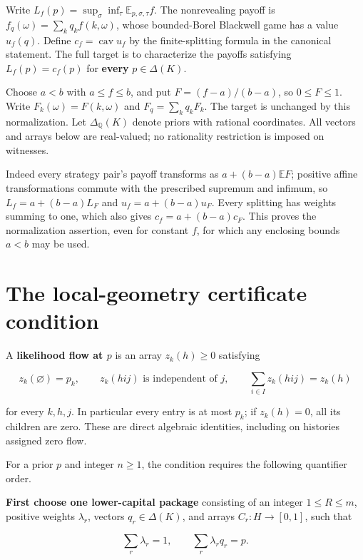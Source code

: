 \documentclass[11pt,a4paper]{article}
\begin{document}
Write \(L_f(p)=\sup_\sigma\inf_\tau\mathbb E_{p,\sigma,\tau} f\). The nonrevealing payoff is \(f_q(\omega)=\sum_kq_k f(k,\omega)\), whose bounded-Borel Blackwell game has a value \(u_f(q)\). Define \(c_f=\operatorname{cav}u_f\) by the finite-splitting formula in the canonical statement. The full target is to characterize the payoffs satisfying \(L_f(p)=c_f(p)\) for \textbf{every} \(p\in\Delta(K)\).

Choose \(a<b\) with \(a\le f\le b\), and put \(F=(f-a)/(b-a)\), so \(0\le F\le1\). Write \(F_k(\omega)=F(k,\omega)\) and \(F_q=\sum_kq_kF_k\). The target is unchanged by this normalization. Let \(\Delta_{\mathbb Q}(K)\) denote priors with rational coordinates. All vectors and arrays below are real-valued; no rationality restriction is imposed on witnesses.

Indeed every strategy pair's payoff transforms as \(a+(b-a)\mathbb E F\); positive affine transformations commute with the prescribed supremum and infimum, so \(L_f=a+(b-a)L_F\) and \(u_f=a+(b-a)u_F\). Every splitting has weights summing to one, which also gives \(c_f=a+(b-a)c_F\). This proves the normalization assertion, even for constant \(f\), for which any enclosing bounds \(a<b\) may be used.

\clearpage
\section{The local-geometry certificate condition}

A \textbf{likelihood flow at \(p\)} is an array \(z_k(h)\ge0\) satisfying

\begin{equation}
z_k(\varnothing)=p_k,\qquad
z_k(hij)\text{ is independent of }j,\qquad
\sum_{i\in I}z_k(hij)=z_k(h)
\label{eq:flow}
\end{equation}

for every \(k,h,j\). In particular every entry is at most \(p_k\); if \(z_k(h)=0\), all its children are zero. These are direct algebraic identities, including on histories assigned zero flow.

For a prior \(p\) and integer \(n\ge1\), the condition requires the following quantifier order.

\textbf{First choose one lower-capital package} consisting of an integer \(1\le R\le m\), positive weights \(\lambda_r\), vectors \(q_r\in\Delta(K)\), and arrays \(C_r:H\to[0,1]\), such that

\begin{equation}
\sum_r\lambda_r=1,\qquad \sum_r\lambda_rq_r=p. \label{eq:split}
\end{equation}
\end{document}
